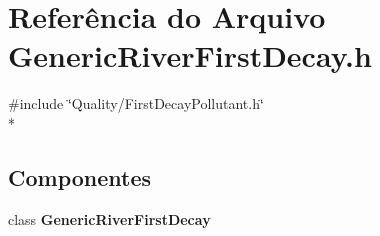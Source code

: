 \section{Referência do Arquivo Generic\+River\+First\+Decay.\+h}
\label{_generic_river_first_decay_8h}
{\ttfamily \#include \char`\"{}Quality/\+First\+Decay\+Pollutant.\+h\char`\"{}}\\*
\subsection*{Componentes}
\begin{DoxyCompactItemize}
\item 
class {\bf Generic\+River\+First\+Decay}
\end{DoxyCompactItemize}
